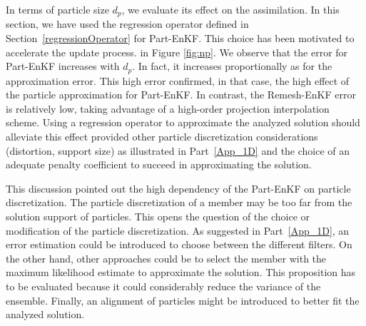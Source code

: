 In terms of particle size $d_p$, we evaluate its effect on the assimilation. In this section, we have used the regression operator defined in Section~\ref{regressionOperator} for Part-EnKF. This choice has been motivated to accelerate the update process.
in Figure \ref{fig:np}. We observe that the error for Part-EnKF increases with $d_p$. In fact, it increases proportionally as for the approximation error. This high error confirmed, in that case, the high effect of the particle approximation for Part-EnKF. In contrast, the Remesh-EnKF error is relatively low, taking advantage of a high-order projection interpolation scheme. Using a regression operator to approximate the analyzed solution should alleviate this effect provided other particle discretization considerations (distortion, support size) as illustrated in Part~\ref{App_1D} and the choice of an adequate penalty coefficient to succeed in approximating the solution.

This discussion pointed out the high dependency of the Part-EnKF on particle discretization. The particle discretization of a member may be too far from the solution support of particles. This opens the question of the choice or modification of the particle discretization. As suggested in Part~\ref{App_1D}, an error estimation could be introduced to choose between the different filters. On the other hand, other approaches could be to select the member with the maximum likelihood estimate to approximate the solution. This proposition has to be evaluated because it could considerably reduce the variance of the ensemble. Finally, an alignment of particles might be introduced to better fit the analyzed solution.

\newpage

